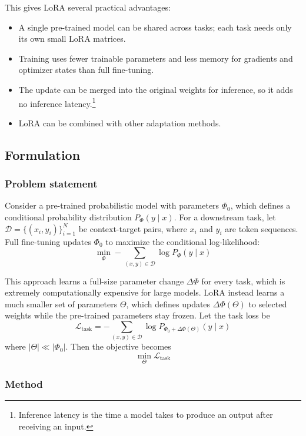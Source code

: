 This gives LoRA several practical advantages:
\begin{itemize}
	\item A single pre-trained model can be shared across tasks; each task needs only its own small LoRA matrices.
	\item Training uses fewer trainable parameters and less memory for gradients and optimizer states than full fine-tuning.
	\item The update can be merged into the original weights for inference, so it adds no inference latency.\footnote{Inference latency is the time a model takes to produce an output after receiving an input.}
	\item LoRA can be combined with other adaptation methods.
\end{itemize}

\subsection{Formulation}

\subsubsection{Problem statement}

Consider a pre-trained probabilistic model with parameters
\(\Phi_0\), which defines a conditional probability distribution \(P_{\Phi}(y\mid x)\).
For a downstream task, let \(\mathcal{D} = \{(x_i,y_i)\}_{i=1}^{N}\) be context-target pairs, where \(x_i\) and \(y_i\) are token sequences.
Full fine-tuning updates \(\Phi_0\) to maximize the conditional log-likelihood:
\[
	\min_{\Phi}
	- \sum_{(x,y)\in\mathcal{D}}
	\log P_{\Phi}(y \mid x)
\]

This approach learns a full-size parameter change \(\Delta\Phi\) for every task, which is extremely computationally expensive for large models.
LoRA instead learns a much smaller set of parameters \(\Theta\), which defines updates \(\Delta\Phi(\Theta)\) to selected weights while the pre-trained parameters stay frozen.
Let the task loss be
\[
	\mathcal{L}_{\mathrm{task}} =
	- \sum_{(x,y)\in\mathcal{D}}
	\log P_{\Phi_0+\Delta\Phi(\Theta)}(y \mid x)
\]
where \(|\Theta|\ll|\Phi_0|\).
Then the objective becomes
\[
	\min_{\Theta} \mathcal{L}_{\mathrm{task}}
\]

\subsubsection{Method}

